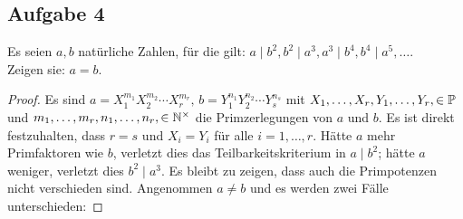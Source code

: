 \subsection{Aufgabe 4}
Es seien $a, b$ natürliche Zahlen, für die gilt:
$a \mid b^2, b^2 \mid a^3, a^3 \mid b^4, b^4 \mid a^5, \dots$.\\
Zeigen sie: $a = b$.
\begin{proof}
  Es sind $a = X_1^{m_1}X_2^{m_2} \dotsm X_r^{m_r},\,
    b = Y_1^{n_1}Y_2^{n_2} \dotsm Y_s^{n_s}$
  mit $X_1,\dotsc,X_r,Y_1,\dotsc,Y_r, \in \mathbb{P}$ und
  $m_1,\dotsc,m_r,n_1,\dotsc,n_r, \in \mathbb{N}^\times$
  die Primzerlegungen von $a$ und $b$.
  Es ist direkt festzuhalten, dass $r = s$ und $X_i = Y_i$ für alle
  $i = 1,\dotsc,r$. Hätte $a$ mehr Primfaktoren wie $b$,
  verletzt dies das Teilbarkeitskriterium \parencite[33]{book:zahlentheorie} in $a \mid b^2$;
  hätte $a$ weniger, verletzt dies $b^2 \mid a^3$.
  Es bleibt zu zeigen, dass auch die Primpotenzen nicht verschieden sind.
  Angenommen $a \neq b$ und es werden zwei Fälle unterschieden:


\end{proof}
